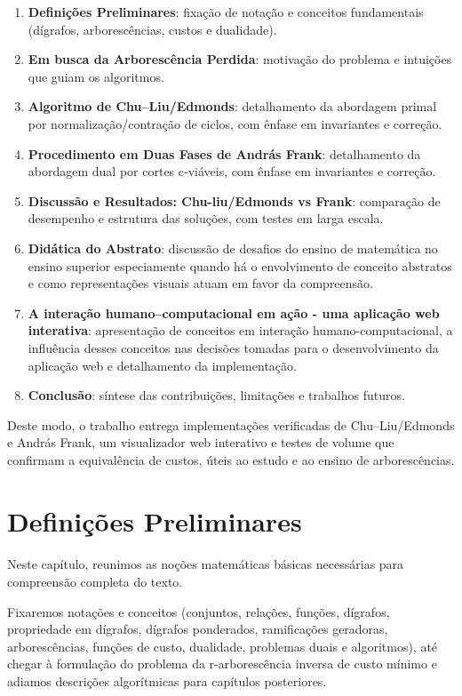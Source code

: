 \documentclass[12pt,a4paper]{article}
\begin{document}
\begin{enumerate}
    \item \textbf{Definições Preliminares}: fixação de notação e conceitos fundamentais (dígrafos, arborescências, custos e dualidade).
    \item \textbf{Em busca da Arborescência Perdida}: motivação do problema e intuições que guiam os algoritmos.
    \item \textbf{Algoritmo de Chu--Liu/Edmonds}: detalhamento da abordagem primal por normalização/contração de ciclos, com ênfase em invariantes e correção.
    \item \textbf{Procedimento em Duas Fases de András Frank}: detalhamento da abordagem dual por cortes c‑viáveis, com ênfase em invariantes e correção.
    \item \textbf{Discussão e Resultados: Chu-liu/Edmonds vs Frank}: comparação de desempenho e estrutura das soluções, com testes em larga escala.
    \item \textbf{Didática do Abstrato}: discussão de desafios do ensino de matemática no ensino superior especiamente quando há o envolvimento de conceito abstratos e como representações visuais atuam em favor da compreensão.
    \item \textbf{A interação humano--computacional em ação - uma aplicação web interativa}: apresentação de conceitos em interação humano-computacional, a influência desses conceitos nas decisões tomadas para o desenvolvimento da aplicação web e detalhamento da implementação.
    \item \textbf{Conclusão}: síntese das contribuições, limitações e trabalhos futuros.
\end{enumerate}

Deste modo, o trabalho entrega implementações verificadas de Chu--Liu/Edmonds e András Frank, um visualizador web interativo e testes de volume que confirmam a equivalência de custos, úteis ao estudo e ao ensino de arborescências.

\section{Definições Preliminares}
\paragraph{}
Neste capítulo, reunimos as noções matemáticas básicas necessárias para compreensão completa do texto. 

Fixaremos notações e conceitos (conjuntos, relações, funções, dígrafos, propriedade em dígrafos, dígrafos ponderados, ramificações geradoras, arborescências, funções de custo, dualidade, problemas duais e algoritmos), até chegar à formulação do problema da r-arborescência inversa de custo mínimo e adiamos descrições algorítmicas para capítulos posteriores.
\end{document}
